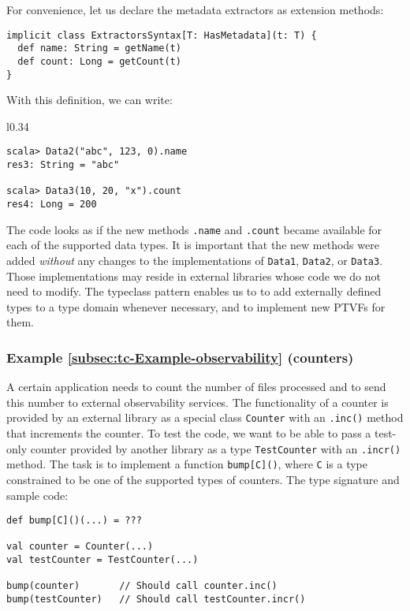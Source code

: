 For convenience, let us declare the metadata extractors as extension
methods:
\begin{lstlisting}
implicit class ExtractorsSyntax[T: HasMetadata](t: T) {
  def name: String = getName(t)
  def count: Long = getCount(t)
}
\end{lstlisting}
With this definition, we can write:

\begin{wrapfigure}{l}{0.34\columnwidth}%
\vspace{-0.85\baselineskip}
\begin{lstlisting}
scala> Data2("abc", 123, 0).name
res3: String = "abc"

scala> Data3(10, 20, "x").count
res4: Long = 200
\end{lstlisting}

\vspace{-0.95\baselineskip}
\end{wrapfigure}%

\noindent The code looks as if the new methods \lstinline!.name!
and \lstinline!.count! became available for each of the supported
data types. It is important that the new methods were added \emph{without}
any changes to the implementations of \lstinline!Data1!, \lstinline!Data2!,
or \lstinline!Data3!. Those implementations may reside in external
libraries whose code we do not need to modify. The typeclass pattern
enables us to to add externally defined types to a type domain whenever
necessary, and to implement new PTVFs for them.

\subsubsection{Example \label{subsec:tc-Example-observability}\ref{subsec:tc-Example-observability}
(counters)}

A certain application needs to count the number of files processed
and to send this number to external observability services. The functionality
of a counter is provided by an external library as a special class
\lstinline!Counter! with an \lstinline!.inc()! method that increments
the counter. To test the code, we want to be able to pass a test-only
counter provided by another library as a type \lstinline!TestCounter!
with an \lstinline!.incr()! method. The task is to implement a function
\lstinline!bump[C]()!, where \lstinline!C! is a type constrained
to be one of the supported types of counters. The type signature and
sample code:
\begin{lstlisting}
def bump[C]()(...) = ???

val counter = Counter(...)
val testCounter = TestCounter(...)

bump(counter)       // Should call counter.inc()
bump(testCounter)   // Should call testCounter.incr()
\end{lstlisting}


